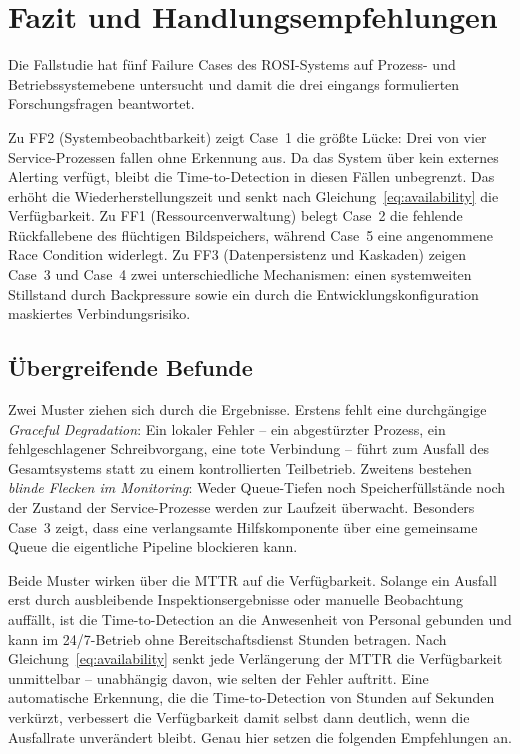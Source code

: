 
\section{Fazit und Handlungsempfehlungen}
\label{sec:fazit}

Die Fallstudie hat fünf Failure Cases des ROSI-Systems auf Prozess- und
Betriebssystemebene untersucht und damit die drei eingangs formulierten
Forschungsfragen beantwortet.

Zu FF2 (Systembeobachtbarkeit) zeigt Case~1 die größte Lücke: Drei von vier
Service-Prozessen fallen ohne Erkennung aus. Da das System über kein externes Alerting
verfügt, bleibt die Time-to-Detection in diesen Fällen unbegrenzt. Das erhöht die
Wiederherstellungszeit und senkt nach Gleichung~\ref{eq:availability} die Verfügbarkeit.
Zu FF1 (Ressourcenverwaltung) belegt Case~2 die fehlende Rückfallebene des flüchtigen
Bildspeichers, während Case~5 eine angenommene Race Condition widerlegt. Zu FF3
(Datenpersistenz und Kaskaden) zeigen Case~3 und Case~4 zwei unterschiedliche Mechanismen:
einen systemweiten Stillstand durch Backpressure sowie ein durch die
Entwicklungskonfiguration maskiertes Verbindungsrisiko.

\subsection{Übergreifende Befunde}
\label{sec:fazit-uebergreifend}

Zwei Muster ziehen sich durch die Ergebnisse. Erstens fehlt eine durchgängige
\textit{Graceful Degradation}: Ein lokaler Fehler -- ein abgestürzter Prozess, ein
fehlgeschlagener Schreibvorgang, eine tote Verbindung -- führt zum Ausfall des
Gesamtsystems statt zu einem kontrollierten Teilbetrieb. Zweitens bestehen
\textit{blinde Flecken im Monitoring}: Weder Queue-Tiefen noch Speicherfüllstände noch der
Zustand der Service-Prozesse werden zur Laufzeit überwacht. Besonders Case~3 zeigt, dass
eine verlangsamte Hilfskomponente über eine gemeinsame Queue die eigentliche Pipeline
blockieren kann.

Beide Muster wirken über die MTTR auf die Verfügbarkeit. Solange ein Ausfall erst durch
ausbleibende Inspektionsergebnisse oder manuelle Beobachtung auffällt, ist die
Time-to-Detection an die Anwesenheit von Personal gebunden und kann im 24/7-Betrieb ohne
Bereitschaftsdienst Stunden betragen. Nach Gleichung~\ref{eq:availability} senkt jede
Verlängerung der MTTR die Verfügbarkeit unmittelbar -- unabhängig davon, wie selten der
Fehler auftritt. Eine automatische Erkennung, die die Time-to-Detection von Stunden auf
Sekunden verkürzt, verbessert die Verfügbarkeit damit selbst dann deutlich, wenn die
Ausfallrate unverändert bleibt. Genau hier setzen die folgenden Empfehlungen an.

